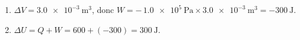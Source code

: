 \documentclass[11pt,a4paper]{article}
\begin{document}
\begin{corrige}
\begin{enumerate}[label=\alph*)]
  \item $\Delta V = \qty{+3.0e-3}{\cubic\metre}$, donc $W = -\,\qty{1.0e5}{\pascal}\times\qty{3.0e-3}{\cubic\metre} = \qty{-300}{\joule}$.
  \item $\Delta U = Q + W = 600 + (-300) = \qty{+300}{\joule}$.
\end{enumerate}
\end{corrige}
\end{document}
